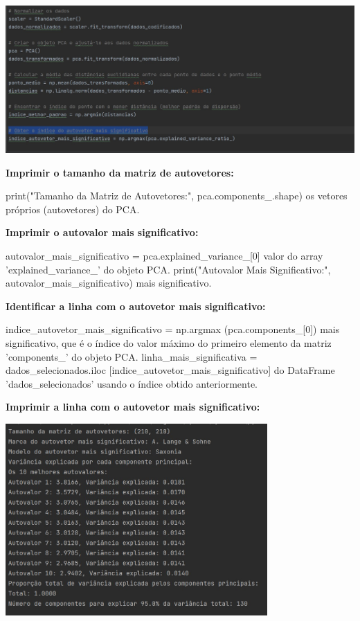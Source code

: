 \documentclass[12pt, a4paper]{article}
\begin{document}
\begin{center}
    \includegraphics[width=14cm]{figura6.jpg}
\end{center}
\textbf{Imprimir o tamanho da matriz de autovetores:}


print("Tamanho da Matriz de Autovetores:", pca.components\_.shape)  
os vetores próprios (autovetores) do PCA.


\textbf{Imprimir o autovalor mais significativo:}


autovalor\_mais\_significativo = pca.explained\_variance\_[0]  
valor do array 'explained\_variance\_' do objeto PCA.
print("Autovalor Mais Significativo:", 
autovalor\_mais\_significativo)  %
mais significativo.


\textbf{Identificar a linha com o autovetor mais significativo:}


indice\_autovetor\_mais\_significativo = np.argmax
(pca.components\_[0])  %
mais significativo, que é o índice do valor máximo 
do primeiro elemento da matriz 'components\_' do objeto PCA.
linha\_mais\_significativa = dados\_selecionados.iloc
[indice\_autovetor\_mais\_significativo] 
do DataFrame 'dados\_selecionados' usando o índice obtido 
anteriormente.


\textbf{Imprimir a linha com o autovetor mais significativo:}


\begin{center}
    \includegraphics[width=10cm]{figura7.jpg}
\end{center}
\end{document}
